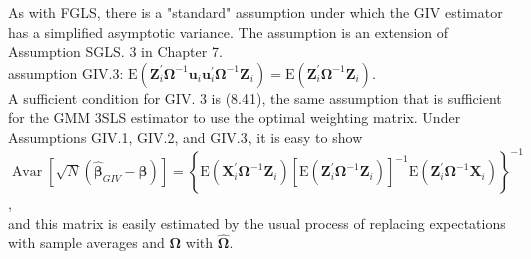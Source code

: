 \documentclass[10pt]{article}
\begin{document}
As with FGLS, there is a "standard" assumption under which the GIV estimator has a simplified asymptotic variance. The assumption is an extension of Assumption SGLS. 3 in Chapter 7.\\
assumption GIV.3: $\mathrm{E}\left(\mathbf{Z}_{i}^{\prime} \boldsymbol{\Omega}^{-1} \mathbf{u}_{i} \mathbf{u}_{i}^{\prime} \boldsymbol{\Omega}^{-1} \mathbf{Z}_{i}\right)=\mathrm{E}\left(\mathbf{Z}_{i}^{\prime} \boldsymbol{\Omega}^{-1} \mathbf{Z}_{i}\right)$.\\
A sufficient condition for GIV. 3 is (8.41), the same assumption that is sufficient for the GMM 3SLS estimator to use the optimal weighting matrix. Under Assumptions GIV.1, GIV.2, and GIV.3, it is easy to show\\
$\operatorname{Avar}\left[\sqrt{N}\left(\hat{\boldsymbol{\beta}}_{G I V}-\boldsymbol{\beta}\right)\right]=\left\{\mathrm{E}\left(\mathbf{X}_{i}^{\prime} \boldsymbol{\Omega}^{-1} \mathbf{Z}_{i}\right)\left[\mathrm{E}\left(\mathbf{Z}_{i}^{\prime} \boldsymbol{\Omega}^{-1} \mathbf{Z}_{i}\right)\right]^{-1} \mathrm{E}\left(\mathbf{Z}_{i}^{\prime} \boldsymbol{\Omega}^{-1} \mathbf{X}_{i}\right)\right\}^{-1}$,\\
and this matrix is easily estimated by the usual process of replacing expectations with sample averages and $\boldsymbol{\Omega}$ with $\hat{\boldsymbol{\Omega}}$.
\end{document}
